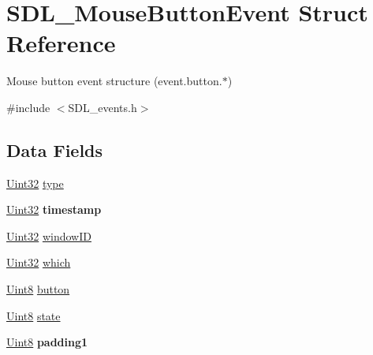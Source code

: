 \hypertarget{struct_s_d_l___mouse_button_event}{}\section{S\+D\+L\+\_\+\+Mouse\+Button\+Event Struct Reference}
\label{struct_s_d_l___mouse_button_event}


Mouse button event structure (event.\+button.$\ast$)  




{\ttfamily \#include $<$S\+D\+L\+\_\+events.\+h$>$}

\subsection*{Data Fields}
\begin{DoxyCompactItemize}
\item 
\hyperlink{_s_d_l__stdinc_8h_add440eff171ea5f55cb00c4a9ab8672d}{Uint32} \hyperlink{struct_s_d_l___mouse_button_event_aa40a9b05c3154032b9f2d7220e9f08dc}{type}
\item 
\hyperlink{_s_d_l__stdinc_8h_add440eff171ea5f55cb00c4a9ab8672d}{Uint32} {\bfseries timestamp}\hypertarget{struct_s_d_l___mouse_button_event_abf1ed7edeab81db9c05d899836a44a2f}{}\label{struct_s_d_l___mouse_button_event_abf1ed7edeab81db9c05d899836a44a2f}

\item 
\hyperlink{_s_d_l__stdinc_8h_add440eff171ea5f55cb00c4a9ab8672d}{Uint32} \hyperlink{struct_s_d_l___mouse_button_event_a78d9995068d6f40cd78bb8db7351b0a1}{window\+ID}
\item 
\hyperlink{_s_d_l__stdinc_8h_add440eff171ea5f55cb00c4a9ab8672d}{Uint32} \hyperlink{struct_s_d_l___mouse_button_event_abd239700243abe3b42bfee05bbf65fa7}{which}
\item 
\hyperlink{_s_d_l__stdinc_8h_a2944638813a090aa23e62f4da842c3e2}{Uint8} \hyperlink{struct_s_d_l___mouse_button_event_a63c1d3c03e676c0ea5864dc6d0b0082c}{button}
\item 
\hyperlink{_s_d_l__stdinc_8h_a2944638813a090aa23e62f4da842c3e2}{Uint8} \hyperlink{struct_s_d_l___mouse_button_event_a6b8d8e916bc56265a3fd279bd26b6d1b}{state}
\item 
\hyperlink{_s_d_l__stdinc_8h_a2944638813a090aa23e62f4da842c3e2}{Uint8} {\bfseries padding1}\hypertarget{struct_s_d_l___mouse_button_event_a418ddf227b900bac743797ea1d27040f}{}\label{struct_s_d_l___mouse_button_event_a418ddf227b900bac743797ea1d27040f}


\end{DoxyCompactItemize}
